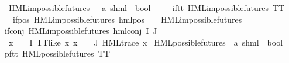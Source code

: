 \begin{isabellebody}
\ HML{\isacharunderscore}{\kern0pt}impossible{\isacharunderscore}{\kern0pt}futures\ {\isacharcolon}{\kern0pt}{\isacharcolon}{\kern0pt}\ \ {\isachardoublequoteopen}{\isacharparenleft}{\kern0pt}{\isacharprime}{\kern0pt}a{\isacharcomma}{\kern0pt}\ {\isacharprime}{\kern0pt}s{\isacharparenright}{\kern0pt}hml\ {\isasymRightarrow}\ bool{\isachardoublequoteclose}\isanewline
\ \ \isanewline
\ \ if{\isacharunderscore}{\kern0pt}tt{\isacharcolon}{\kern0pt}\ {\isachardoublequoteopen}HML{\isacharunderscore}{\kern0pt}impossible{\isacharunderscore}{\kern0pt}futures\ TT{\isachardoublequoteclose}\ {\isacharbar}{\kern0pt}\isanewline
\ \ if{\isacharunderscore}{\kern0pt}pos{\isacharcolon}{\kern0pt}\ {\isachardoublequoteopen}HML{\isacharunderscore}{\kern0pt}impossible{\isacharunderscore}{\kern0pt}futures\ {\isacharparenleft}{\kern0pt}hml{\isacharunderscore}{\kern0pt}pos\ {\isasymalpha}\ {\isasymphi}{\isacharparenright}{\kern0pt}{\isachardoublequoteclose}\ \ {\isachardoublequoteopen}HML{\isacharunderscore}{\kern0pt}impossible{\isacharunderscore}{\kern0pt}futures\ {\isasymphi}{\isachardoublequoteclose}\ {\isacharbar}{\kern0pt}\isanewline
if{\isacharunderscore}{\kern0pt}conj{\isacharcolon}{\kern0pt}\ {\isachardoublequoteopen}HML{\isacharunderscore}{\kern0pt}impossible{\isacharunderscore}{\kern0pt}futures\ {\isacharparenleft}{\kern0pt}hml{\isacharunderscore}{\kern0pt}conj\ I\ J\ {\isasymPhi}{\isacharparenright}{\kern0pt}{\isachardoublequoteclose}\isanewline
{}\ {\isachardoublequoteopen}{\isasymforall}x\ {\isasymin}\ {\isacharparenleft}{\kern0pt}{\isasymPhi}\ {\isacharbackquote}{\kern0pt}\ I{\isacharparenright}{\kern0pt}{\isachardot}{\kern0pt}\ TT{\isacharunderscore}{\kern0pt}like\ x{\isachardoublequoteclose}\ {\isachardoublequoteopen}{\isasymforall}x\ {\isasymin}\ {\isacharparenleft}{\kern0pt}{\isasymPhi}\ {\isacharbackquote}{\kern0pt}\ J{\isacharparenright}{\kern0pt}{\isachardot}{\kern0pt}\ {\isacharparenleft}{\kern0pt}HML{\isacharunderscore}{\kern0pt}trace\ x{\isacharparenright}{\kern0pt}{\isachardoublequoteclose}\isanewline
\isanewline
{}\isamarkupfalse%
\ HML{\isacharunderscore}{\kern0pt}possible{\isacharunderscore}{\kern0pt}futures\ {\isacharcolon}{\kern0pt}{\isacharcolon}{\kern0pt}\ {\isachardoublequoteopen}{\isacharparenleft}{\kern0pt}{\isacharprime}{\kern0pt}a{\isacharcomma}{\kern0pt}\ {\isacharprime}{\kern0pt}s{\isacharparenright}{\kern0pt}hml\ {\isasymRightarrow}\ bool{\isachardoublequoteclose}\isanewline
\ \ \isanewline
pf{\isacharunderscore}{\kern0pt}tt{\isacharcolon}{\kern0pt}\ {\isachardoublequoteopen}HML{\isacharunderscore}{\kern0pt}possible{\isacharunderscore}{\kern0pt}futures\ TT{\isachardoublequoteclose}\ {\isacharbar}{\kern0pt}\isanewline

\end{isabellebody}
